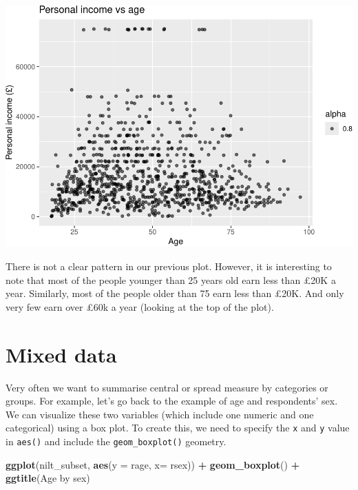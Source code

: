 \documentclass[
]{book}
\newenvironment{Shaded}{\begin{snugshade}}{\end{snugshade}}
\newcommand{\AttributeTok}[1]{\textcolor[rgb]{0.13,0.29,0.53}{#1}}
\newcommand{\FunctionTok}[1]{\textcolor[rgb]{0.13,0.29,0.53}{\textbf{#1}}}
\newcommand{\NormalTok}[1]{#1}
\newcommand{\SpecialCharTok}[1]{\textcolor[rgb]{0.81,0.36,0.00}{\textbf{#1}}}
\newcommand{\StringTok}[1]{\textcolor[rgb]{0.31,0.60,0.02}{#1}}
\begin{document}
\begin{flushleft}\includegraphics[width=1\linewidth]{lab-workbook_files/figure-latex/unnamed-chunk-71-1} \end{flushleft}

There is not a clear pattern in our previous plot. However, it is interesting to note that most of the people younger than 25 years old earn less than £20K a year. Similarly, most of the people older than 75 earn less than £20K. And only very few earn over £60k a year (looking at the top of the plot).

\hypertarget{mixed-data}{%
\section{Mixed data}\label{mixed-data}}

Very often we want to summarise central or spread measure by categories or groups. For example, let's go back to the example of age and respondents' sex. We can visualize these two variables (which include one numeric and one categorical) using a box plot. To create this, we need to specify the \texttt{x} and \texttt{y} value in \texttt{aes()} and include the \texttt{geom\_boxplot()} geometry.

\begin{Shaded}
\begin{Highlighting}[]
\FunctionTok{ggplot}\NormalTok{(nilt\_subset, }\FunctionTok{aes}\NormalTok{(}\AttributeTok{y =}\NormalTok{ rage, }\AttributeTok{x=}\NormalTok{ rsex)) }\SpecialCharTok{+}
  \FunctionTok{geom\_boxplot}\NormalTok{() }\SpecialCharTok{+}
  \FunctionTok{ggtitle}\NormalTok{(}\StringTok{\textquotesingle{}Age by sex\textquotesingle{}}\NormalTok{)}
\end{Highlighting}
\end{Shaded}
\end{document}
